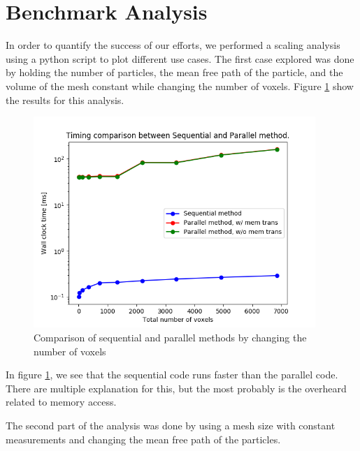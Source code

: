\section{Benchmark Analysis}
In order to quantify the success of our efforts, we performed a scaling analysis 
using a python script to plot different use cases.   
The first case explored was done by holding the number of particles, 
the mean free path of the particle, and the volume of the mesh constant while changing 
the number of voxels. Figure \ref{compare1} show the results for this analysis. 

\begin{figure}[]
 \begin{centering}
 \centering
 \includegraphics[width=0.6\linewidth,height=8cm]{../figs/compare.png}
 \caption{Comparison of sequential and parallel methods by changing the number of voxels}
 \label{compare1}
 \end{centering}
\end{figure}

In figure \ref{compare1}, we see that the sequential code runs faster than the 
parallel code. There are multiple explanation for this, but the most probably is the 
overheard related to memory access.

The second part of the analysis was done by using a mesh size with constant measurements 
and changing the mean free path of the particles. 


